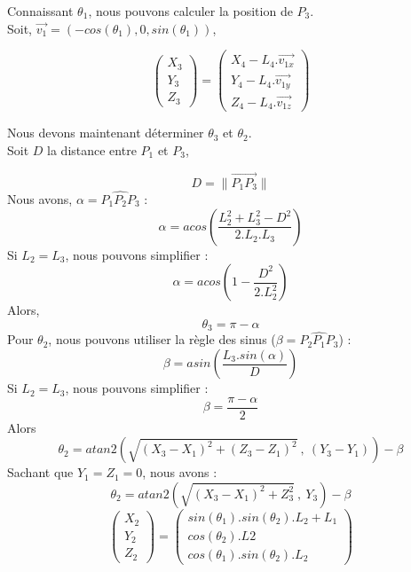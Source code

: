 Connaissant $\theta_1$, nous pouvons calculer la position de $P_3$.
\saut\\
Soit, $\vec{v_1} = (-cos(\theta_1),0,sin(\theta_1))$,

\begin{equation}
\left( \begin{array}{c}X_3\\Y_3\\Z_3 \end{array} \right) 
= 
\left ( \begin{array}{c}
X_4 - L_4.\overrightarrow{v_{1x}}\\
Y_4 - L_4.\overrightarrow{v_{1y}}\\
Z_4 - L_4.\overrightarrow{v_{1z}}
\end{array} \right )
\end{equation}

Nous devons maintenant d\'eterminer $\theta_3$ et $\theta_2$.\\
Soit $D$ la distance entre $P_1$ et $P_3$, 

$$ D = \| \overrightarrow{P_1P_3}\|$$
Nous avons, $\alpha = \widehat{P_1P_2P_3}$ :
$$ \alpha = acos \left( \frac{L_2^2 + L_3^2 - D^2}{2.L_2.L_3} \right)$$
Si $L_2=L_3$, nous pouvons simplifier :
$$ \alpha = acos \left( 1 - \frac{D^2}{2.L_2^2} \right) $$
Alors,
$$ \theta_3 = \pi - \alpha $$
Pour $\theta_2$, nous pouvons utiliser la r\`egle des sinus ($\beta = \widehat{P_2P_1P_3}$) :
$$\beta = asin \left( \frac{L_3.sin(\alpha)}{D} \right) $$
Si $L_2=L_3$, nous pouvons simplifier :
$$\beta = \frac{\pi - \alpha}{2}$$
Alors
$$ \theta_2 = atan2( \sqrt{ (X_3 - X_1)^2 + (Z_3 - Z_1)^2}~,~(Y_3 - Y_1) ) - \beta$$
Sachant que $Y_1 = Z_1 = 0$, nous avons :
$$ \theta_2 = atan2( \sqrt{ (X_3 - X_1)^2 + Z_3 ^2}~,~Y_3 ) - \beta$$
\begin{equation}
\left( \begin{array}{c}X_2\\Y_2\\Z_2 \end{array} \right) 
= 
\left ( \begin{array}{c}
sin(\theta_1).sin(\theta_2).L_2 + L_1\\
cos(\theta_2).L2\\
cos(\theta_1).sin(\theta_2).L_2
\end{array} \right )
\end{equation}


